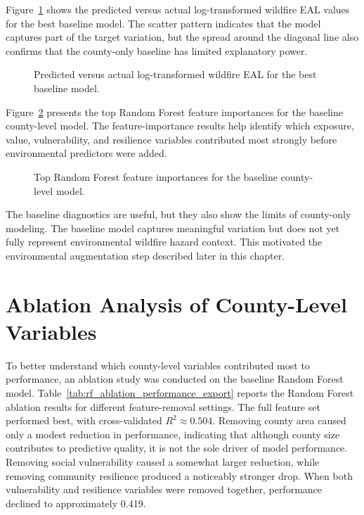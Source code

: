 Figure~\ref{fig:baseline_predicted_vs_actual} shows the predicted versus actual log-transformed wildfire EAL values for the best baseline model. The scatter pattern indicates that the model captures part of the target variation, but the spread around the diagonal line also confirms that the county-only baseline has limited explanatory power.

\begin{figure}[htbp]
    \centering
    \caption{Predicted versus actual log-transformed wildfire EAL for the best baseline model.}
    \label{fig:baseline_predicted_vs_actual}
\end{figure}

Figure~\ref{fig:baseline_rf_feature_importance} presents the top Random Forest feature importances for the baseline county-level model. The feature-importance results help identify which exposure, value, vulnerability, and resilience variables contributed most strongly before environmental predictors were added.

\begin{figure}[htbp]
    \centering
    \caption{Top Random Forest feature importances for the baseline county-level model.}
    \label{fig:baseline_rf_feature_importance}
\end{figure}

The baseline diagnostics are useful, but they also show the limits of county-only modeling. The baseline model captures meaningful variation but does not yet fully represent environmental wildfire hazard context. This motivated the environmental augmentation step described later in this chapter.

\section{Ablation Analysis of County-Level Variables}

To better understand which county-level variables contributed most to performance, an ablation study was conducted on the baseline Random Forest model. Table~\ref{tab:rf_ablation_performance_export} reports the Random Forest ablation results for different feature-removal settings. The full feature set performed best, with cross-validated $R^2 \approx 0.504$. Removing county area caused only a modest reduction in performance, indicating that although county size contributes to predictive quality, it is not the sole driver of model performance. Removing social vulnerability caused a somewhat larger reduction, while removing community resilience produced a noticeably stronger drop. When both vulnerability and resilience variables were removed together, performance declined to approximately 0.419.

